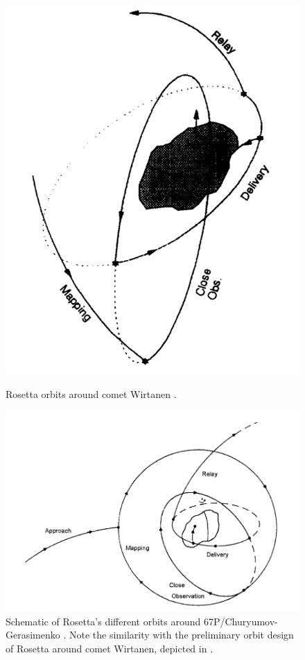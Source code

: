 \begin{figure}[htb]
\begin{minipage}[t]{0.45\linewidth}
\centering
\includegraphics[width=\textwidth]{rosettaoldmartin.png}
\caption{Rosetta orbits around comet Wirtanen \cite{rosettaoldmartin}.}
\label{fig:rosettaoldmartin}
\end{minipage}
\hspace{0.5cm}
\begin{minipage}[t]{0.45\linewidth}
\centering
\includegraphics[width=\textwidth]{rosettanew2007.png}
\caption{Schematic of Rosetta's different orbits around 67P/Churyumov-Gerasimenko \cite{rosettanew2007}. Note the similarity with the preliminary orbit design of Rosetta around comet Wirtanen, depicted in .}
\label{fig:rosettanew2007}
\end{minipage}
\end{figure}

